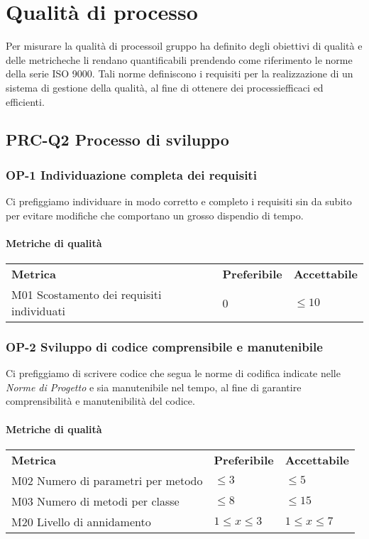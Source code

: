 \section{Qualità di processo}
Per misurare la qualità di processo\glosp il gruppo ha definito degli obiettivi di qualità e delle metriche\glosp che li rendano quantificabili prendendo come riferimento le norme della serie ISO 9000. Tali norme definiscono i requisiti per la realizzazione di un sistema di gestione della qualità, al fine di ottenere dei processi\glosp efficaci ed efficienti.
	\subsection{PRC-Q2 Processo di sviluppo}
		\subsubsection{OP-1 Individuazione completa dei requisiti} 
			Ci prefiggiamo individuare in modo corretto e completo i requisiti sin da subito per evitare modifiche che comportano un grosso dispendio di tempo.
			\paragraph{Metriche di qualità} \mbox{}
			\begin{longtable} {
					>{}p{80mm} 
					>{}p{25mm}
					>{}p{25mm}
				}
				\rowcolor{gray!50}
				\textbf{Metrica} & \textbf{Preferibile} & \textbf{Accettabile} \TBstrut \TBstrut \\
				M01 Scostamento dei requisiti individuati & 0 & $\le 10$ \TBstrut \\ [2mm]
			\end{longtable}
			
		\subsubsection{OP-2 Sviluppo di codice comprensibile e manutenibile}
			Ci prefiggiamo di scrivere codice che segua le norme di codifica indicate nelle \textit{Norme di Progetto} e sia manutenibile nel tempo, al fine di garantire comprensibilità e manutenibilità del codice.
			\paragraph{Metriche di qualità} \mbox{}
			\begin{longtable} {
					>{}p{80mm} 
					>{}p{25mm}
					>{}p{25mm}
				}
				\rowcolor{gray!50}
				\textbf{Metrica} & \textbf{Preferibile} & \textbf{Accettabile} \TBstrut \TBstrut \\
				M02 Numero di parametri per metodo & $ \le 3$ & $ \le 5$ \TBstrut \\ [2mm]
				M03 Numero di metodi per classe & $ \le 8$ & $ \le 15$ \TBstrut \\ [2mm]
				M20 Livello di annidamento & $1 \le x \le 3$ & $1 \le x \le 7$ \TBstrut \\ [2mm]
			\end{longtable}
	
